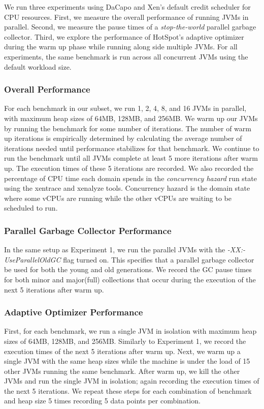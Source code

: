 \documentclass{sig-alternate}
\begin{document}
We run three experiments using DaCapo and Xen's default credit scheduler for CPU resources. First, we measure the overall performance of running JVMs in parallel. Second, we measure the pause times of a \textit{stop-the-world} parallel garbage collector. Third, we explore the performance of HotSpot's adaptive optimizer during the warm up phase while running along side multiple JVMs. For all experiments, the same benchmark is run across all concurrent JVMs using the default workload size.

\subsubsection{Overall Performance} \label{sssec:overallperf}
For each benchmark in our subset, we run 1, 2, 4, 8, and 16 JVMs in parallel, with maximum heap sizes of 64MB, 128MB, and 256MB. We warm up our JVMs by running the benchmark for some number of iterations. The number of warm up iterations is empirically determined by calculating the average number of iterations needed until performance stabilizes for that benchmark. We continue to run the benchmark until all JVMs complete at least 5 more iterations after warm up.  The execution times of these 5 iterations are recorded. We also recorded the percentage of CPU time each domain spends in the \textit{concurrency hazard} run state using the xentrace and xenalyze tools. Concurrency hazard is the domain state where some vCPUs are running while the other vCPUs are waiting to be scheduled to run. 

\subsubsection{Parallel Garbage Collector Performance}
In the same setup as Experiment 1, we run the parallel JVMs with the \textit{-XX:-UseParallelOldGC} flag turned on. This specifies that a parallel garbage collector be used for both the young and old generations. We record the GC pause times for both minor and major(full) collections that occur during the execution of the next 5 iterations after warm up.

\subsubsection{Adaptive Optimizer Performance}
First, for each benchmark, we run a single JVM in isolation with maximum heap sizes of 64MB, 128MB, and 256MB. Similarly to Experiment 1, we record the execution times of the next 5 iterations after warm up. Next, we warm up a single JVM with the same heap sizes while the machine is under the load of 15 other JVMs running the same benchmark. After warm up, we kill the other JVMs and run the single JVM in isolation; again recording the execution times of the next 5 iterations. We repeat these steps for each combination of benchmark and heap size 5 times recording 5 data points per combination.
\end{document}
